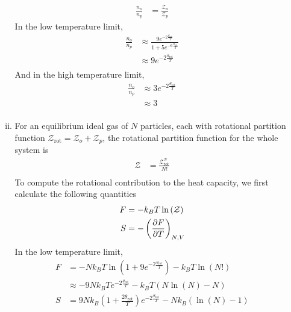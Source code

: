 \documentclass[]{article}
\begin{document}
\begin{enumerate}[1)]
\begin{enumerate}[i.]
\begin{equation}
\begin{split}
\frac{n_o}{n_p} & = \frac{\mathcal{Z}_o}{\mathcal{Z}_p}
\end{split}
\end{equation}
In the low temperature limit, 
\begin{equation}
\begin{split}
\frac{n_o}{n_p} & \approx \frac{9e^{-2\frac{\theta_{\text{rot}}}{T}} }{1 + 5e^{-6\frac{\theta_{\text{rot}}}{T}} } \\
& \approx 9e^{-2\frac{\theta_{\text{rot}}}{T}} \\
\end{split}
\end{equation}
And in the high temperature limit,
\begin{equation}
\begin{split}
\frac{n_o}{n_p} & \approx 3e^{-2\frac{\theta_{\text{rot}}}{T}} \\
& \approx 3 \\
\end{split}
\end{equation}
\item For an equilibrium ideal gas of $N$ particles, each with rotational partition function $\mathcal{Z}_\text{rot} = \mathcal{Z}_o + \mathcal{Z}_p$, the rotational partition function for the whole system is
\begin{equation}
\begin{split}
\mathcal{Z} & = \frac{\mathcal{Z}_\text{rot}^N}{N!} \\
\end{split}
\end{equation}
To compute the rotational contribution to the heat capacity, we first calculate the following quantities
\begin{equation}
\begin{split}
F & = -k_B T \ln \left( \mathcal{Z}\right)\\
S & = - \left( \pdv{F}{T}\right)_{N,V}\\
\end{split}
\end{equation}
In the low temperature limit,
\begin{equation}
\begin{split}
F & = -Nk_B T \ln \left( 1 + 9e^{-2\frac{\theta_{\text{rot}}}{T}}\right) - k_BT \ln(N!)\\
& \approx -9Nk_B T  e^{-2\frac{\theta_{\text{rot}}}{T}} -k_BT\left(  N\ln(N) - N \right) \\
S & = 9Nk_B\left(  1 + \frac{2 \theta_{\text{rot}}}{T} \right)  e^{-2\frac{\theta_{\text{rot}}}{T}}   -Nk_B\left(  \ln(N) - 1 \right)  \\

\end{split}
\end{equation}
\end{enumerate}
\end{enumerate}
\end{document}
